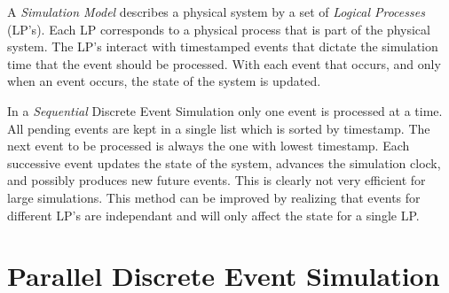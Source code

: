 \documentclass[11pt]{book}
\begin{document}
\noindent
A \emph{Simulation Model} describes a physical system by a set of \emph{Logical Processes}
(LP's). Each LP corresponds to a physical process that is part of the physical system. The
LP's interact with timestamped events that dictate the simulation time that the event should
be processed. With each event that occurs, and only when an event occurs, the state of the
system is updated.

In a \emph{Sequential} Discrete Event Simulation only one event is processed at a time.
All pending events are kept in a single list which is sorted by timestamp. The next event
to be processed is always the one with lowest timestamp. Each successive event updates the
state of the system, advances the simulation clock, and possibly produces new future events.
This is clearly not very efficient for large simulations. This method can be improved by
realizing that events for different LP's are independant and will only affect the state for
a single LP.

\section{Parallel Discrete Event Simulation}
\end{document}

